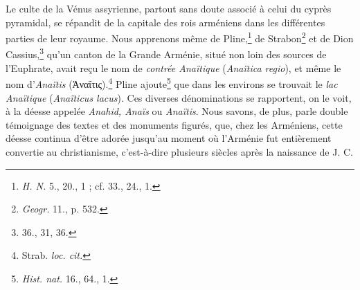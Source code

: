 \documentclass{article}
\begin{document}
Le culte de la Vénus assyrienne, partout sans doute associé à celui du cyprès pyramidal, se répandit de la capitale des rois arméniens dans les différentes parties de leur royaume. Nous apprenons même de Pline,\footnote{\emph{H. N.} 5., 20., 1 ; cf. 33., 24., 1.} de Strabon\footnote{\emph{Geogr.} 11., p. 532.} et de Dion Cassius,\footnote{36., 31, 36.} qu'un canton de la Grande Arménie, situé non loin des sources de l'Euphrate, avait reçu le nom de \emph{contrée Anaïtique} (\emph{Anaïtica regio}), et même le nom d'\emph{Anaïtis} (\textgreek{Ἀναΐτις}).\footnote{Strab. \emph{loc. cit.}} Pline ajoute\footnote{\emph{Hist. nat.} 16., 64., 1.} que dans les environs se trouvait le \emph{lac Anaïtique} (\emph{Anaïticus lacus}). Ces diverses dénominations se rapportent, on le voit, à la déesse appelée \emph{Anahid, Anaïs} ou \emph{Anaïtis}. Nous savons, de plus, parle double témoignage des textes et des monuments figurés, que, chez les Arméniens, cette déesse continua d'être adorée jusqu'au moment où l'Arménie fut entièrement convertie au christianisme, c'est-à-dire plusieurs siècles après la naissance de J. C.
\end{document}
